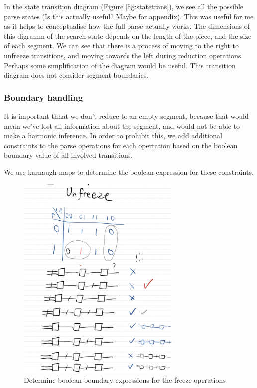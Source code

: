 \documentclass[12pt,a4paper,twoside,openright]{report}
\theoremstyle{definition}
\begin{document}
In the state transition diagram (Figure \ref{fig:statetrans}), we see all the possible parse states (Is this actually useful? Maybe for appendix). This was useful for me as it helps to conceptualise how the full parse actually works. The dimensions of this digramm of the search state depends on the length of the piece, and the size of each segment. We can see that there is a process of moving to the right to unfreeze transitions, and moving towards the left during reduction operations. Perhaps some simplification of the diagram would be useful. This transition diagram does not consider segment boundaries.

\FloatBarrier
\subsubsection{Boundary handling}

It is important thhat we don't reduce to an empty segment, because that would mean we've lost all information about the segment, and would not be able to make a harmonic inference. In order to prohibit this, we add additional constraints to the parse operations for each opertation based on the boolean boundary value of all involved transitions.
\par
We use karnaugh maps to determine the boolean expression for these constraints.

\begin{figure}[ht]
  \centering
  \includegraphics[width=0.7\textwidth]{karnaughunfreeze}
  \caption{Determine boolean boundary expressions for the freeze operations}
  \label{fig:karnaugh}
\end{figure}
\end{document}
